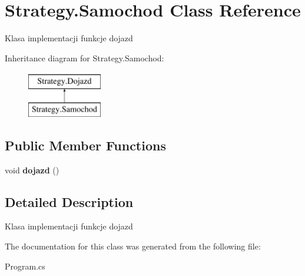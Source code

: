 \hypertarget{class_strategy_1_1_samochod}{}\section{Strategy.\+Samochod Class Reference}
\label{class_strategy_1_1_samochod}


Klasa implementacji funkcje dojazd  


Inheritance diagram for Strategy.\+Samochod\+:\begin{figure}[H]
\begin{center}
\leavevmode
\includegraphics[height=2.000000cm]{class_strategy_1_1_samochod}
\end{center}
\end{figure}
\subsection*{Public Member Functions}
\begin{DoxyCompactItemize}
\item 
\mbox{\label{class_strategy_1_1_samochod_a0e08ae22e6202ec3a0f6065f6885b048}} 
void {\bfseries dojazd} ()
\end{DoxyCompactItemize}


\subsection{Detailed Description}
Klasa implementacji funkcje dojazd 



The documentation for this class was generated from the following file\+:\begin{DoxyCompactItemize}
\item 
Program.\+cs\end{DoxyCompactItemize}
